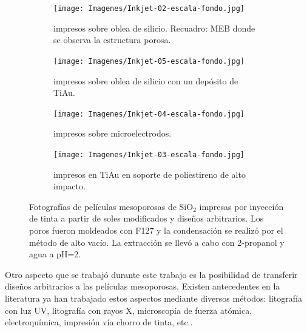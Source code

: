   			\begin{figure}[b!]
			 	   	    \centering
			 	   	    \begin{subfigure}[t]{0.495\textwidth}
			        	\texttt{[image: Imagenes/Inkjet-02-escala-fondo.jpg]}
			        	\caption{\pdmF\space impresos sobre oblea de silicio. Recuadro: MEB donde se observa la estructura porosa.}
			       		\end{subfigure}
			     		\centering
			     		\begin{subfigure}[t]{0.495\textwidth}
			     		\texttt{[image: Imagenes/Inkjet-05-escala-fondo.jpg]}
			    		\caption{\pdmF\space impresos sobre oblea de silicio con un depósito de Ti\textbar Au.}
			    		\end{subfigure}
			    		\centering
			    		\begin{subfigure}[t]{0.495\textwidth}
			         	\texttt{[image: Imagenes/Inkjet-04-escala-fondo.jpg]}
			        	\caption{\pdmF\space impresos sobre microelectrodos.}
			        	\end{subfigure}
			        	\centering
			        	\begin{subfigure}[t]{0.495\textwidth}
			     		\texttt{[image: Imagenes/Inkjet-03-escala-fondo.jpg]}
 			        	\caption{\pdmF\space impresos en Ti\textbar	Au en soporte de poliestireno de alto impacto.}
			        	\end{subfigure}
			     		\caption[Electrodos impresos]{Fotografías de películas mesoporosas de SiO$_2$ impresas por inyección de tinta a partir de soles modificados y diseños arbitrarios. Los poros fueron moldeados con F127 y la condensación se realizó por el método de alto vacío. La extracción se llevó a cabo con 2-propanol y agua a pH=2.}
			     		\label{fig:flexibles}
			     	   	\end{figure}

 	  Otro aspecto que se trabajó durante este trabajo es la posibilidad de transferir diseños arbitrarios a las películas mesoporosas. Existen antecedentes en la literatura ya han trabajado estos aspectos mediante diversos métodos: litografía con luz UV, litografía con rayos X, microscopía de fuerza atómica, electroquímica, impresión vía chorro de tinta, etc.\cite{Innocenzi2008}. 

